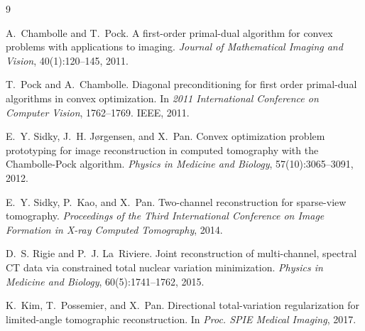 \documentclass{article}
\begin{document}
\begin{thebibliography}{9}

A.~Chambolle and T.~Pock.
\newblock A first-order primal-dual algorithm for convex problems with
  applications to imaging.
\newblock \emph{Journal of Mathematical Imaging and Vision}, 40(1):120--145,
  2011.

T.~Pock and A.~Chambolle.
\newblock Diagonal preconditioning for first order primal-dual algorithms in
  convex optimization.
\newblock In \emph{2011 International Conference on Computer Vision},
  1762--1769. IEEE, 2011.

E.~Y. Sidky, J.~H. J{\o}rgensen, and X.~Pan.
\newblock Convex optimization problem prototyping for image reconstruction in
  computed tomography with the Chambolle-Pock algorithm.
\newblock \emph{Physics in Medicine and Biology}, 57(10):3065--3091, 2012.

E.~Y. Sidky, P.~Kao, and X.~Pan.
\newblock Two-channel reconstruction for sparse-view tomography.
\newblock \emph{Proceedings of the Third International Conference on Image
  Formation in X-ray Computed Tomography}, 2014.

D.~S. Rigie and P.~J. La~Riviere.
\newblock Joint reconstruction of multi-channel, spectral CT data via
  constrained total nuclear variation minimization.
\newblock \emph{Physics in Medicine and Biology}, 60(5):1741--1762, 2015.

K.~Kim, T.~Possemier, and X.~Pan.
\newblock Directional total-variation regularization for limited-angle
  tomographic reconstruction.
\newblock In \emph{Proc. SPIE Medical Imaging}, 2017.

\end{thebibliography}
\end{document}
